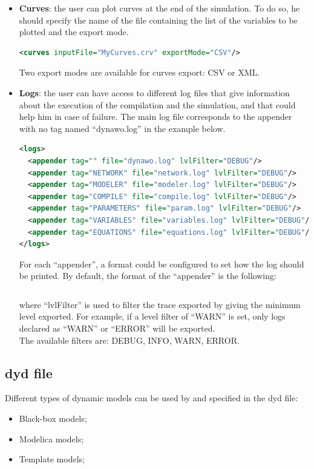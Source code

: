 \documentclass[a4paper, 12pt]{report}
\begin{document}
\begin{itemize}
\item \textbf{Curves}: the user can plot curves at the end of the simulation. To do so, he should specify the name of the file containing the list of the variables to be plotted and the export mode.
\begin{lstlisting}[language=XML, morekeywords={curves},numbers=none]
<curves inputFile="MyCurves.crv" exportMode="CSV"/>
\end{lstlisting}
Two export modes are available for curves export: CSV or XML.

\item \textbf{Logs}: the user can have access to different log files that give information about the execution of the compilation and the simulation, and that could help him in case of failure. The main log file corresponds to the appender with no tag named ``dynawo.log'' in the example below.
\begin{lstlisting}[language=XML, morekeywords={logs}]
<logs>
  <appender tag="" file="dynawo.log" lvlFilter="DEBUG"/>
  <appender tag="NETWORK" file="network.log" lvlFilter="DEBUG"/>
  <appender tag="MODELER" file="modeler.log" lvlFilter="DEBUG"/>
  <appender tag="COMPILE" file="compile.log" lvlFilter="DEBUG"/>
  <appender tag="PARAMETERS" file="param.log" lvlFilter="DEBUG"/>
  <appender tag="VARIABLES" file="variables.log" lvlFilter="DEBUG"/>
  <appender tag="EQUATIONS" file="equations.log" lvlFilter="DEBUG"/>
</logs>
\end{lstlisting}

For each ``appender'', a format could be configured to set how the log should be printed. By default, the format of the ``appender'' is the following:
\begin{lstlisting}[numbers=none]
%Y-%m-%d %H:%M:%S | <lvlFilter> | log
\end{lstlisting}

where ``lvlFilter'' is used to filter the trace exported by giving the minimum level exported. For example, if a level filter of ``WARN'' is set, only logs declared as ``WARN'' or ``ERROR'' will be exported. \\

The available filters are: DEBUG, INFO, WARN, ERROR.
\end{itemize}

\subsection{dyd file}

Different types of dynamic models can be used by \Dynawo and specified in the dyd file:
\begin{itemize}
\item Black-box models;
\item Modelica models;
\item Template models;
\end{itemize}
\end{document}
